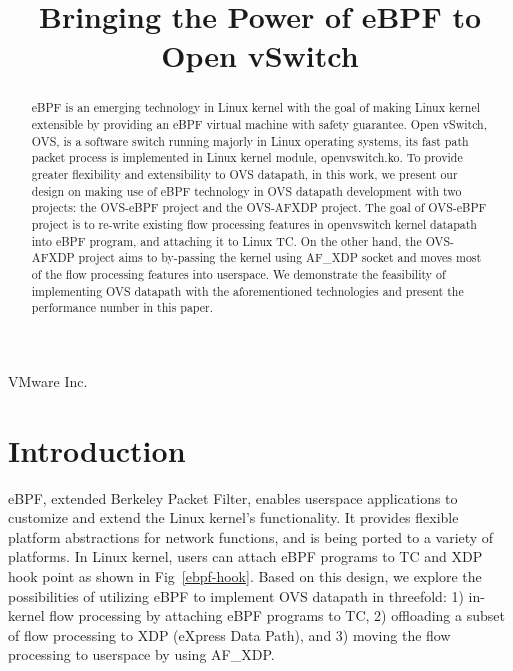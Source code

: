 \documentclass[10pt]{sigplanconf}
\begin{document}
\title{Bringing the Power of eBPF to Open vSwitch}
{VMware Inc.}{}

\maketitle

\begin{abstract}
eBPF is an emerging technology in Linux kernel with the goal of making Linux kernel
extensible by providing an eBPF virtual machine with safety guarantee.
Open vSwitch, OVS, is a software switch running majorly in Linux
operating systems, its fast path packet process is implemented in Linux kernel
module, openvswitch.ko.
To provide greater flexibility and extensibility to OVS datapath, in this
work, we present our design on making use of eBPF technology in OVS datapath
development with two projects: the OVS-eBPF project and the OVS-AFXDP project.
The goal of OVS-eBPF project is to re-write existing flow processing features
in openvswitch kernel datapath into eBPF program, and attaching it
to Linux TC.
On the other hand, the OVS-AFXDP project aims to by-passing the kernel
using AF\_XDP socket and moves most of the flow processing features
into userspace.
We demonstrate the feasibility of implementing OVS datapath with the
aforementioned technologies and present the performance number in this paper.
\end{abstract}

\section{Introduction}\label{introduction}

eBPF, extended Berkeley Packet Filter, enables userspace applications to
customize and extend the Linux kernel's functionality. It provides
flexible platform abstractions for network functions, and is being ported
to a variety of platforms. In Linux kernel, users can attach eBPF programs
to TC and XDP hook point as shown in Fig~\ref{ebpf-hook}. Based on this
design, we explore the possibilities of utilizing eBPF to implement OVS
datapath in threefold:
1) in-kernel flow processing by attaching eBPF programs to TC,
2) offloading a subset of flow processing to XDP (eXpress Data Path),
and 3) moving the flow processing to userspace by using AF\_XDP.
\end{document}
